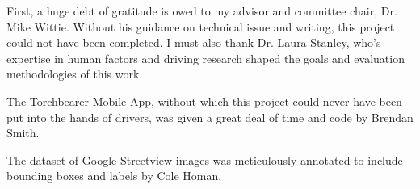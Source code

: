 First, a huge debt of gratitude is owed to my advisor and committee chair, Dr. Mike Wittie. Without his guidance on technical issue and writing, this project could not have been completed. I must also thank Dr. Laura Stanley, who's expertise in human factors and driving research shaped the goals and evaluation methodologies of this work.

The Torchbearer Mobile App, without which this project could never have been put into the hands of drivers, was given a great deal of time and code by Brendan Smith.

The dataset of Google Streetview images was meticulously annotated to include bounding boxes and labels by Cole Homan.